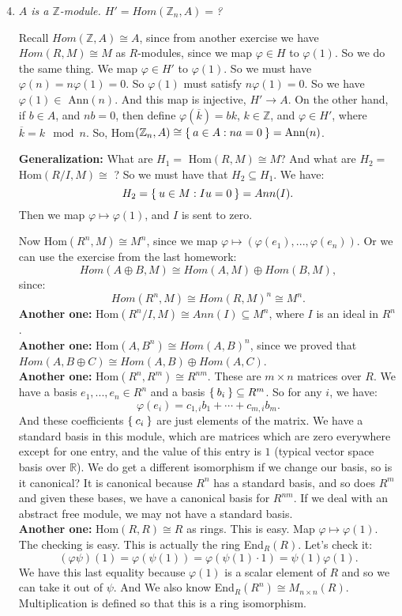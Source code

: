 \documentclass[12pt]{amsbook}
\theoremstyle{plain}
\numberwithin{section}{chapter}
\numberwithin{equation}{chapter}
\theoremstyle{definition}
\theoremstyle{remark}
\newcommand{\sub}{\subseteq}
\newcommand{\R}{\mathbb{R}}
\newcommand{\z}{\mathbb{Z}}
\renewcommand{\phi}{\varphi}
\begin{document}
\begin{enumerate}[label=\arabic*.]

\setcounter{enumi}{3}
\item \textit{$A$ is a $\z$-module. $H' =Hom(\z_n,A) = $?}

Recall $Hom(\z,A) \cong A$, since from another exercise we have $Hom(R,M) \cong M$ as $R$-modules, since we map $\phi \in H$ to $\phi(1)$. So we do the same thing. We map $\phi \in H'$ to $\phi(1)$. So we must have $\phi(n) = n\phi(1) = 0$. So $\phi(1)$ must satisfy $n\phi(1) = 0$. So we have $\phi(1) \in $ Ann$(n)$. And this map is injective, $H' \to A$. On the other hand, if $b \in A$, and $nb = 0$, then define $\phi(\overline{k}) = bk$, $k \in \z$, and $\phi \in H'$, where $\overline{k} = k \mod n$. So, Hom$(\z_n,A) \cong \Set{a \in A: na = 0} = \text{Ann}(n)$. 

\textbf{Generalization: }What are $H_1 =$ Hom$(R,M) \cong M$? And what are $H_2 =$ Hom$(R/I,M) \cong$ ? So we must have that $H_2 \sub H_1$. We have: 
$$
H_2 = \Set{u \in M: Iu = 0} = Ann(I). 
$$
Then we map $\phi \mapsto \phi(1)$, and $I$ is sent to zero. 

Now Hom$(R^n,M) \cong M^n$, since we map $\phi \mapsto (\phi(e_1),...,\phi(e_n))$. Or we can use the exercise from the last homework:
$$
Hom(A \oplus B,M) \cong Hom(A,M) \oplus Hom(B,M),
$$
since:
$$
Hom(R^n,M) \cong Hom(R,M)^n \cong M^n.
$$
\textbf{Another one:} Hom$(R^n/I,M) \cong Ann(I) \sub M^n$, where $I$ is an ideal in $R^n$. \\
\textbf{Another one:} Hom$(A,B^n) \cong Hom(A,B)^n$, since we proved that $Hom(A,B \oplus C) \cong Hom(A,B) \oplus Hom(A,C)$. \\
\textbf{Another one:} Hom$(R^n,R^m) \cong R^{nm}$. These are $m \times n$ matrices over $R$. We have a basis $e_1,...,e_n \in R^n$ and a basis $\Set{b_i} \sub R^m$. So for any $i$, we have:
$$
\phi(e_i) = c_{1,i}b_1 + \cdots + c_{m,i}b_m.
$$ 
And these coefficients $\Set{c_i}$ are just elements of the matrix. We have a standard basis in this module, which are matrices which are zero everywhere except for one entry, and the value of this entry is $1$ (typical vector space basis over $\R$). We do get a different isomorphism if we change our basis, so is it canonical? It is canonical because $R^n$ has a standard basis, and so does $R^m$ and given these bases, we have a canonical basis for $R^{nm}$. If we deal with an abstract free module, we may not have a standard basis. \\
\textbf{Another one: }Hom$(R,R) \cong R$ as rings. This is easy. Map $\phi \mapsto \phi(1)$. The checking is easy. This is actually the ring End$_R(R)$. Let's check it: 
$$
(\phi\psi)(1) = \phi(\psi(1)) = \phi(\psi(1)\cdot 1) = \psi(1) \phi(1).
$$
We have this last equality because $\phi(1)$ is a scalar element of $R$ and so we can take it out of $\psi$. And We also know End$_R(R^n) \cong M_{n \times n}(R)$. Multiplication is defined so that this is a ring isomorphism. 


\end{enumerate}
\end{document}
